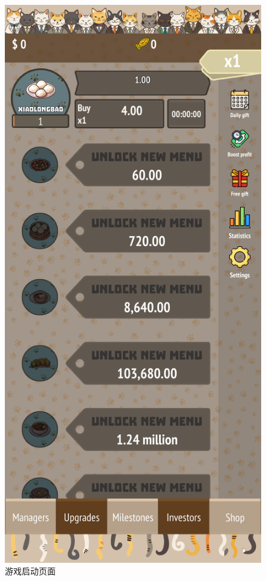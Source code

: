 \documentclass{mancls}%
\begin{document}
\begin{figure}[h]
  \centering
  \includegraphics[height=0.6\textheight]{screenshots/PurrfectEats_004.png}
  \caption{游戏启动页面}
\end{figure}
\end{document}

